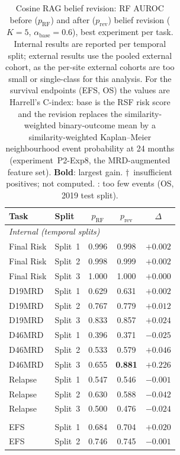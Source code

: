 \documentclass[pdflatex,sn-nature]{sn-jnl}
\begin{document}
\begin{table}[ht]
\caption{Cosine RAG belief revision: RF AUROC before ($p_\text{RF}$) and
after ($p_\text{rev}$) belief revision ($K=5$, $\alpha_\text{base}=0.6$),
best experiment per task. Internal results are reported per temporal
split; external results use the pooled external cohort, as the per-site
external cohorts are too small or single-class for this analysis.
For the survival endpoints (EFS, OS) the values are Harrell's C-index:
base is the RSF risk score and the revision replaces the
similarity-weighted binary-outcome mean by a similarity-weighted
Kaplan--Meier neighbourhood event probability at 24 months
(experiment~P2-Exp8, the MRD-augmented feature set).
\textbf{Bold}: largest gain. $\dagger$~insufficient positives; not
computed. \textemdash: too few events (OS, 2019 test split).}
\label{tab:belief_revision}
\centering
\small
\setlength{\tabcolsep}{7pt}
\begin{tabular}{@{}ll ccc@{}}
\toprule
\textbf{Task} & \textbf{Split} & $p_\text{RF}$ & $p_\text{rev}$ & \textbf{$\Delta$} \\
\midrule
\multicolumn{5}{l}{\textit{Internal (temporal splits)}} \\
Final Risk & Split~1 & 0.996 & 0.998 & $+0.002$ \\
Final Risk & Split~2 & 0.998 & 0.999 & $+0.002$ \\
Final Risk & Split~3 & 1.000 & 1.000 & $+0.000$ \\
D19MRD & Split~1 & 0.629 & 0.631 & $+0.002$ \\
D19MRD & Split~2 & 0.767 & 0.779 & $+0.012$ \\
D19MRD & Split~3 & 0.833 & 0.857 & $+0.024$ \\
D46MRD & Split~1 & 0.396 & 0.371 & $-0.025$ \\
D46MRD & Split~2 & 0.533 & 0.579 & $+0.046$ \\
D46MRD & Split~3 & 0.655 & \textbf{0.881} & $\mathbf{+0.226}$ \\
Relapse & Split~1 & 0.547 & 0.546 & $-0.001$ \\
Relapse & Split~2 & 0.630 & 0.588 & $-0.042$ \\
Relapse & Split~3 & 0.500 & 0.476 & $-0.024$ \\
\addlinespace[2pt]
\multicolumn{5}{l}{\quad\textit{Survival endpoints (C-index; RSF base vs KM revision)}} \\
EFS & Split~1 & 0.684 & 0.704 & $+0.020$ \\
EFS & Split~2 & 0.746 & 0.745 & $-0.001$ \\

\end{tabular}
\end{table}
\end{document}

